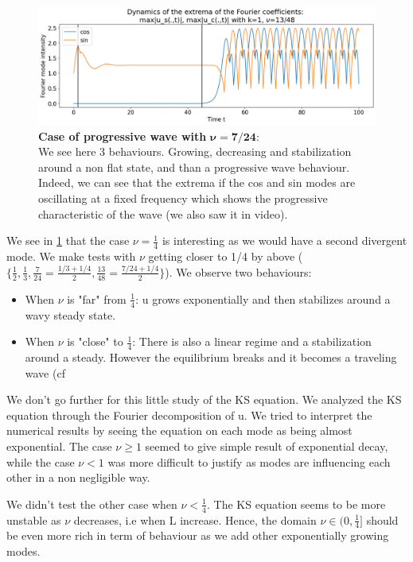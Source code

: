 \documentclass[12pt]{article}
\begin{document}
\begin{figure}[h]
\centering
\includegraphics[width=1\textwidth]{KS_eq/KS_extrema_Fourier_coef.png}
\caption{\textbf{Case of progressive wave with }$\boldsymbol{\nu=7/24}$: \\ We see here 3 behaviours. Growing, decreasing and stabilization around a non flat state, and than a progressive wave behaviour. Indeed, we can see that the extrema if the cos and sin modes are oscillating at a fixed frequency which shows the progressive characteristic of the wave (we also saw it in video).}
\label{fig:KS_eq_nu_inf_1}
\end{figure}


We see in \ref{fig:KS_eq_nu_inf_1} that the case $\nu=\frac{1}{4}$ is interesting as we would have a second divergent mode. We make tests with $\nu$ getting closer to 1/4 by above ($\{\frac{1}{2}, \frac{1}{3}, \frac{7}{24} = \frac{1/3+1/4}{2}, \frac{13}{48} = \frac{7/24 + 1/4}{2}\}$). We observe two behaviours:
\begin{itemize}
    \item When $\nu$ is "far" from $\frac{1}{4}$: u grows exponentially and then stabilizes around a wavy steady state.
    \item When $\nu$ is "close" to $\frac{1}{4}$: There is also a linear regime and a stabilization around a steady. However the equilibrium breaks and it becomes a traveling wave (cf 
\end{itemize}


We don't go further for this little study of the KS equation. We analyzed the KS equation through the Fourier decomposition of u. We tried to interpret the numerical results by seeing the equation on each mode as being almost exponential. The case $\nu \geq1$ seemed to give simple result of exponential decay, while the case $\nu <1$ was more difficult to justify as modes are influencing each other in a non negligible way. 

We didn't test the other case when $\nu <\frac{1}{4}$. The KS equation seems to be more unstable as $\nu$ decreases, i.e when L increase. Hence, the domain $\nu \in (0,\frac{1}{4}] $ should be even more rich in term of behaviour as we add other exponentially growing modes.
\end{document}
